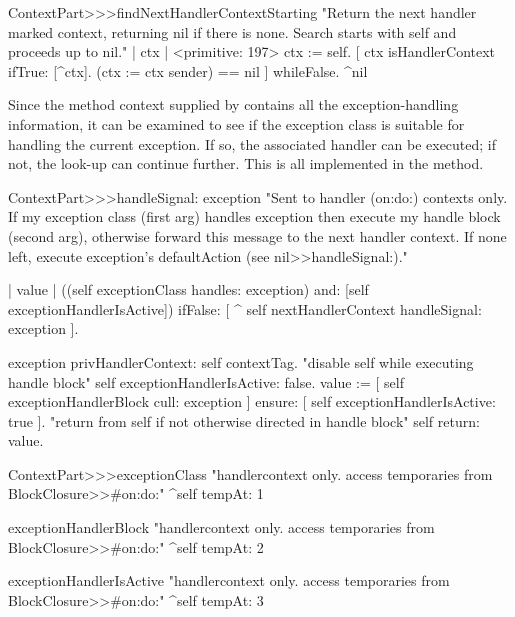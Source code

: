 \begin{code}{}
ContextPart>>>findNextHandlerContextStarting 
	"Return the next handler marked context, returning nil if there 
	is none. Search starts with self and proceeds up to nil." 
	| ctx |	
	<primitive: 197> 
	ctx := self. 
	[  ctx isHandlerContext ifTrue: [^ctx]. 
	   (ctx := ctx sender) == nil ] whileFalse. 
	^nil 
\end{code}

Since the method context supplied by  contains all the exception-handling information, it can be examined to see if the exception class is suitable for handling the current exception.
If so, the associated handler can be executed; if not, the look-up can continue further. 
This is all implemented in the  method.

\begin{code}{}
ContextPart>>>handleSignal: exception
	"Sent to handler (on:do:) contexts only.  If my exception class (first arg) handles exception then execute my handle block (second arg), otherwise forward this message to the next handler context.  If none left, execute exception's defaultAction (see nil>>handleSignal:)."

	| value |
	((self exceptionClass handles: exception)
	and: [self exceptionHandlerIsActive]) 
		ifFalse: [ ^ self nextHandlerContext handleSignal: exception ].

	exception privHandlerContext: self contextTag.
	"disable self while executing handle block"
	self exceptionHandlerIsActive: false. 
	value := [ self exceptionHandlerBlock cull: exception ]
		ensure: [ self exceptionHandlerIsActive: true ].
	"return from self if not otherwise directed in handle block"
	self return: value.  
\end{code}

\begin{code}{}
ContextPart>>>exceptionClass
	"handlercontext only. access temporaries from BlockClosure>>#on:do:"
	^self tempAt: 1
\end{code}

\begin{code}{}
exceptionHandlerBlock
	"handlercontext only. access temporaries from BlockClosure>>#on:do:"
	^self tempAt: 2
\end{code}

\begin{code}{}
exceptionHandlerIsActive
	"handlercontext only. access temporaries from BlockClosure>>#on:do:"
	^self tempAt: 3
\end{code}

